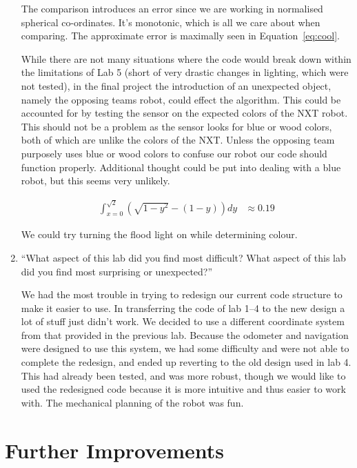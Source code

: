 \documentclass[twocolumn]{article}
\begin{document}
\begin{enumerate}
The comparison introduces an error since we are working in normalised spherical co-ordinates. It's monotonic, which is all we care about when comparing. The approximate error is maximally seen in Equation~\ref{eq:cool}.

While there are not many situations where the code would break down within the limitations of Lab 5 (short of very drastic changes in lighting, which were not tested), in the final project the introduction of an unexpected object, namely the opposing teams robot, could effect the algorithm. This could be accounted for by testing the sensor on the expected colors of the NXT robot. This should not be a problem as the sensor looks for blue or wood colors, both of which are unlike the colors of the NXT. Unless the opposing team purposely uses blue or wood colors to confuse our robot our code should function properly. Additional thought could be put into dealing with a blue robot, but this seems very unlikely.

\begin{align}
\int_{x=0}^{\sqrt{2}} \left(
	\sqrt{1-y^{2}} - (1 - y)
\right) dy &\approx 0.19
\label{eq:cool}
\end{align}

We could try turning the flood light on while determining colour.

\item ``What aspect of this lab did you find most difficult? What aspect of this lab did you find most surprising or unexpected?''

We had the most trouble in trying to redesign our current code structure to make it easier to use. In transferring the code of lab 1--4\cite{alexneil1,alexneil2,alexneil3,alexneil4} to the new design a lot of stuff just didn't work. We decided to use a different coordinate system from that provided in the previous lab\cite{iso}. Because the odometer and navigation were designed to use this system, we had some difficulty and were not able to complete the redesign, and ended up reverting to the old design used in lab 4. This had already been tested, and was more robust, though we would like to used the redesigned code because it is more intuitive and thus easier to work with. The mechanical planning of the robot was fun.

\end{enumerate}

\section{Further Improvements}
\end{document}

